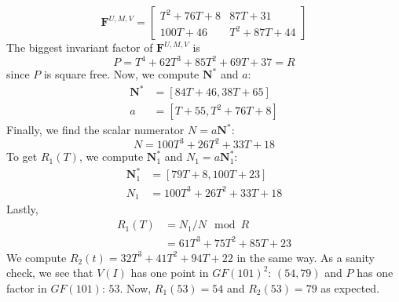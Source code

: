 \documentclass[12pt]{article}
\def\mF{\mathbf{F}}
\def\mN{\mathbf{N}}
\begin{document}
$$ \mF^{U,M,V} =
\begin{bmatrix}
T^2 + 76T + 8&       87T + 31\\
    100T + 46& T^2 + 87T + 44
\end{bmatrix}
$$
The biggest invariant factor of $\mF^{U,M,V}$ is 
$$P = T^4 + 62T^3 + 85T^2 + 69T + 37 = R$$
since $P$ is square free. 
Now, we compute $\mN^*$ and $a$:
\begin{align*}
\mN^* &=[84T + 46, 38T + 65]\\
a &= [T + 55, T^2 + 76T + 8]
\end{align*}
Finally, we find the scalar numerator $N = a\mN^*$:
$$ N = 100T^3 + 26T^2 + 33T + 18$$
To get $R_1(T)$, we compute $\mN_1^*$ and $N_1=a\mN_1^*$:
\begin{align*}
\mN_1^* &= [79T + 8, 100T + 23]\\
N_1 &= 100T^3 + 26T^2 + 33T + 18
\end{align*}
Lastly,
\begin{align*}
R_1(T) &= N_1 / N \mod R \\
       &= 61T^3 + 75T^2 + 85T + 23
\end{align*}
We compute $R_2(t)= 32T^3 + 41T^2 + 94T + 22$ in the same way. 
As a sanity check,
we see that $V(I)$ has one point in $GF(101)^2$:
$(54,79)$ and $P$ has one factor in $GF(101)$: $53$. Now,
$R_1(53) = 54$ and $R_2(53) = 79$ as expected.

\newpage
\end{document}
